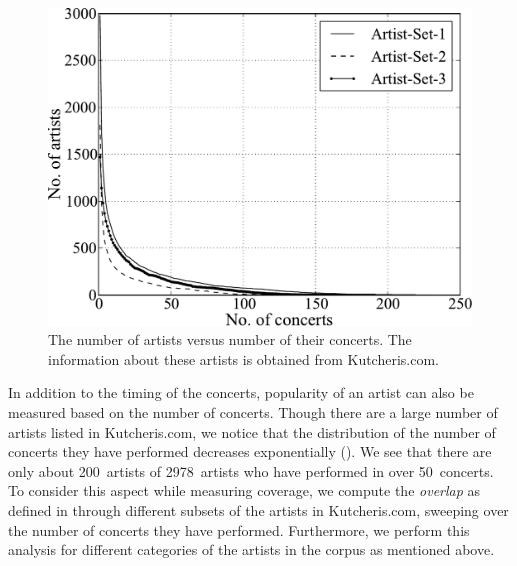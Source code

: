 \begin{figure}
	\begin{center}
		\includegraphics[width=\figSizeSixtyFive]{ch04_datasets/figures/performances-vs-artists.pdf}
	\end{center}
	\caption[The number of artists versus the number of concerts]{The number of artists versus number of their concerts. The information about these artists is obtained from Kutcheris.com.}
	\label{fig:number_artrist_vs_number_concerts}
\end{figure}

In addition to the timing of the concerts, popularity of an artist can also be measured based on the number of concerts. Though there are a large number of artists listed in Kutcheris.com, we notice that the distribution of the number of concerts they have performed decreases exponentially (). We see that there are only about 200~artists of 2978~artists who have performed in over 50~concerts. To consider this aspect while measuring coverage, we compute the \textit{overlap} as defined in  through different subsets of the artists in Kutcheris.com, sweeping over the number of concerts they have performed. Furthermore, we perform this analysis for different categories of the artists in the corpus as mentioned above.

